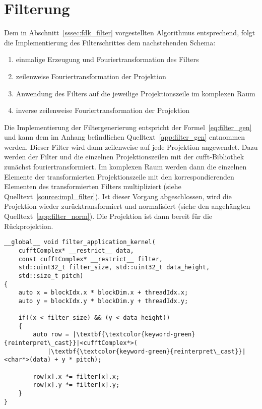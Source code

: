 \section{Filterung}

Dem in Abschnitt~\ref{sssec:fdk_filter} vorgestellten Algorithmus entsprechend, folgt die Implementierung des
Filterschrittes dem nachstehenden Schema:

\begin{enumerate}
    \item einmalige Erzeugung und Fouriertransformation des Filters
    \item zeilenweise Fouriertransformation der Projektion
    \item Anwendung des Filters auf die jeweilige Projektionszeile im komplexen Raum
    \item inverse zeilenweise Fouriertransformation der Projektion
\end{enumerate}

Die Implementierung der Filtergenerierung entspricht der Formel~\ref{eq:filter_gen} und kann dem im Anhang befindlichen
Quelltext~\ref{app:filter_gen} entnommen werden. Dieser Filter wird dann zeilenweise auf jede Projektion angewendet.
Dazu werden der Filter und die einzelnen Projektionszeilen mit der \gls{cufft}-Bibliothek zunächst fouriertransformiert.
Im komplexen Raum werden dann die einzelnen Elemente der transformierten Projektionszeile mit den korrespondierenden
Elementen des transformierten Filters multipliziert (siehe Quelltext~\ref{source:impl_filter}). Ist dieser Vorgang
abgeschlossen, wird die Projektion wieder zurücktransformiert und normalisiert (siehe den angehängten
Quelltext~\ref{app:filter_norm}). Die Projektion ist dann bereit für die Rückprojektion.

\begin{code}
\begin{verbatim}
__global__ void filter_application_kernel(
    cufftComplex* __restrict__ data,
    const cufftComplex* __restrict__ filter,
    std::uint32_t filter_size, std::uint32_t data_height,
    std::size_t pitch)
{
    auto x = blockIdx.x * blockDim.x + threadIdx.x;
    auto y = blockIdx.y * blockDim.y + threadIdx.y;

    if((x < filter_size) && (y < data_height))
    {
        auto row = |\textbf{\textcolor{keyword-green}{reinterpret\_cast}}|<cufftComplex*>(
            |\textbf{\textcolor{keyword-green}{reinterpret\_cast}}|<char*>(data) + y * pitch);

        row[x].x *= filter[x].x;
        row[x].y *= filter[x].y;
    }
}
\end{verbatim}
\label{source:impl_filter}
\end{code}

